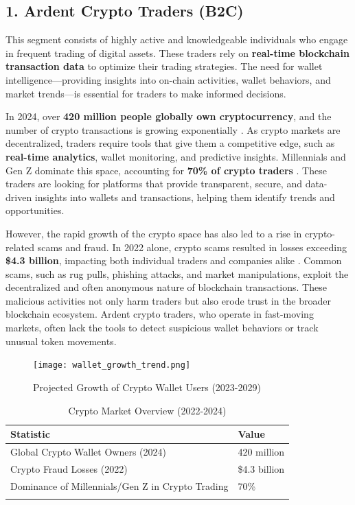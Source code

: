 \documentclass{article}
\begin{document}
\subsection{1. Ardent Crypto Traders (B2C)}

This segment consists of highly active and knowledgeable individuals who engage in frequent trading of digital assets. These traders rely on \textbf{real-time blockchain transaction data} to optimize their trading strategies. The need for wallet intelligence—providing insights into on-chain activities, wallet behaviors, and market trends—is essential for traders to make informed decisions.

In 2024, over \textbf{420 million people globally own cryptocurrency}, and the number of crypto transactions is growing exponentially \cite{DemandSage, Cognitive}. As crypto markets are decentralized, traders require tools that give them a competitive edge, such as \textbf{real-time analytics}, wallet monitoring, and predictive insights. Millennials and Gen Z dominate this space, accounting for \textbf{70\% of crypto traders} \cite{DemandSage}. These traders are looking for platforms that provide transparent, secure, and data-driven insights into wallets and transactions, helping them identify trends and opportunities.

However, the rapid growth of the crypto space has also led to a rise in crypto-related scams and fraud. In 2022 alone, crypto scams resulted in losses exceeding \textbf{\$4.3 billion}, impacting both individual traders and companies alike \cite{Fortune}. Common scams, such as rug pulls, phishing attacks, and market manipulations, exploit the decentralized and often anonymous nature of blockchain transactions. These malicious activities not only harm traders but also erode trust in the broader blockchain ecosystem. Ardent crypto traders, who operate in fast-moving markets, often lack the tools to detect suspicious wallet behaviors or track unusual token movements.

\begin{figure}[h!]
  \centering
  \texttt{[image: wallet\_growth\_trend.png]}  %
  \caption{Projected Growth of Crypto Wallet Users (2023-2029)}
  \label{fig:wallet_growth}
\end{figure}

\begin{longtable}{|p{4cm}|p{8cm}|}
\hline
\textbf{Statistic} & \textbf{Value} \\
\hline
Global Crypto Wallet Owners (2024) & 420 million \\
\hline
Crypto Fraud Losses (2022) & \$4.3 billion \\
\hline
Dominance of Millennials/Gen Z in Crypto Trading & 70\% \\
\hline
\caption{Crypto Market Overview (2022-2024)}
\end{longtable}
\end{document}
